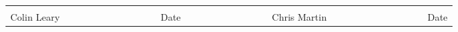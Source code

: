 \begin{singlespacing}
\begin{table}[H]
\centering

\label{my-label}
\begin{tabular}{lllllll}
            &  &                          &  &              &  &                          \\ \cline{1-3} \cline{5-7} 
Colin Leary & ~~~~~~~~~~~~~~~~~ & \multicolumn{1}{r}{Date} & ~~~~~~~~~~~~~~~ & Chris Martin & ~~~~~~~~~~~~~~~~~ & \multicolumn{1}{r}{Date}
\end{tabular}
\end{table}

\end{singlespacing}